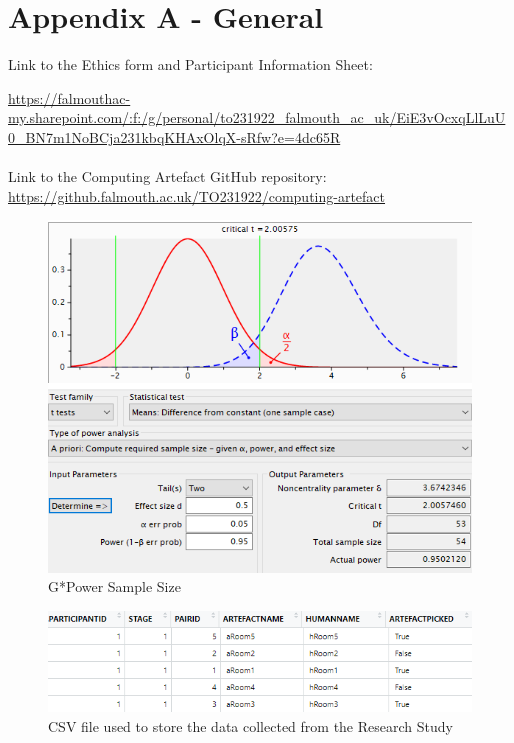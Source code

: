 \newpage
\section*{Appendix A - General} \label{append:a}
Link to the Ethics form and Participant Information Sheet:

\url{https://falmouthac-my.sharepoint.com/:f:/g/personal/to231922_falmouth_ac_uk/EiE3vOcxqLlLuU0_BN7m1NoBCja231kbqKHAxOlqX-sRfw?e=4dc65R}
\\
\\
Link to the Computing Artefact GitHub repository: 
\url{https://github.falmouth.ac.uk/TO231922/computing-artefact}
\begin{figure}[ht]
    \includegraphics[width=\columnwidth]{./Images/gpower.png}
    \centering
    \caption{G*Power Sample Size}
    \label{gpower}
\end{figure}
\begin{figure}[ht]
    \includegraphics[width=\columnwidth]{./Images/csv-image.png}
    \centering
    \caption{CSV file used to store the data collected from the Research Study}
    \label{csv-file}
\end{figure}


